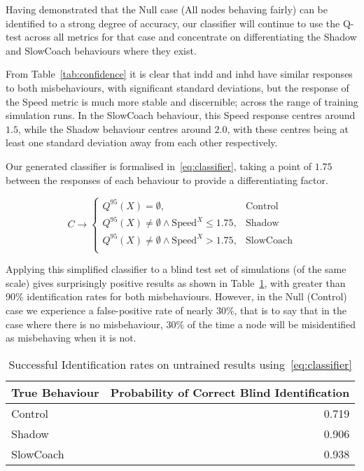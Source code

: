 Having demonstrated that the Null case (All nodes behaving fairly) can be identified to a strong degree of accuracy, our classifier will continue to use the Q-test across all metrics for that case and concentrate on differentiating the Shadow and SlowCoach behaviours where they exist.

From Table~\ref{tab:confidence} it is clear that \gls{indd} and \gls{inhd} have similar responses to both misbehaviours, with significant standard deviations, but the response of the Speed metric is much more stable and discernible; across the range of training simulation runs.
In the SlowCoach behaviour, this Speed response centres around $1.5$, while the Shadow behaviour centres around $2.0$, with these centres being at least one standard deviation away from each other respectively.


Our generated classifier is formalised in~\autoref{eq:classifier}, taking a point of $1.75$ between the responses of each behaviour to provide a differentiating factor.

\begin{equation}
  C \rightarrow 
  \begin{cases}
    Q^{95}(X) = \emptyset,& \text{Control}\\
    Q^{95}(X) \neq \emptyset \land \text{Speed}^X \leq 1.75, & \text{Shadow}\\
    Q^{95}(X) \neq \emptyset \land \text{Speed}^X > 1.75,& \text{SlowCoach}\\
  \end{cases}
  \label{eq:classifier}
\end{equation}

Applying this simplified classifier to a blind test set of simulations (of the same scale) gives surprisingly positive results as shown in Table~\ref{tab:classifier}, with greater than 90\% identification rates for both misbehaviours.
However, in the Null (Control) case we experience a false-positive rate of nearly 30\%, that is to say that in the case where there is no misbehaviour, 30\% of the time a node will be misidentified as misbehaving when it is not.

\begin{table}[h]
  \caption{Successful Identification rates on untrained results using~\autoref{eq:classifier}}
  \centering
  \begin{tabular}{lr}
    \toprule
    True Behaviour &  Probability of Correct Blind Identification \\
    \midrule
    Control        &                                        0.719 \\
    Shadow         &                                        0.906 \\
    SlowCoach      &                                        0.938 \\
    \bottomrule
  \end{tabular}
  \label{tab:classifier}
\end{table}

